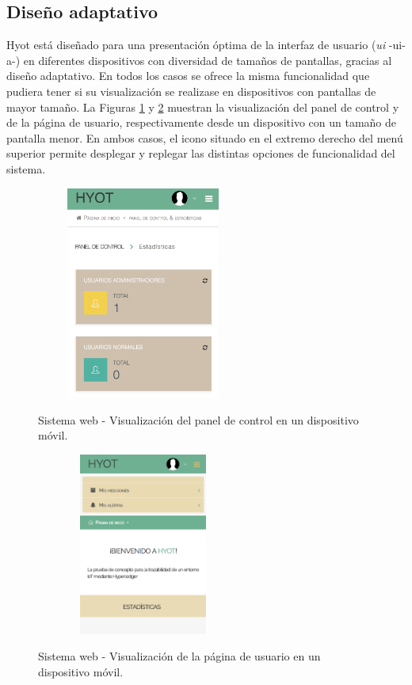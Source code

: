 \documentclass[12pt,a4paper, twoside]{report}
\begin{document}
	\subsection{Diseño adaptativo}
	
	Hyot está diseñado para una presentación óptima de la interfaz de usuario (\textit{\gls{ui}} -\gls{ui-a}-) en diferentes dispositivos con diversidad de tamaños de pantallas, gracias al diseño adaptativo. En todos los casos se ofrece la misma funcionalidad que pudiera tener si su visualización se realizase en dispositivos con pantallas de mayor tamaño. La Figuras \ref{fig:web_responsive1} y \ref{fig:web_responsive2} muestran la visualización del panel de control y de la página de usuario, respectivamente desde un dispositivo con un tamaño de pantalla menor. En ambos casos, el icono situado en el extremo derecho del menú superior permite desplegar y replegar las distintas opciones de funcionalidad del sistema.

		\begin{figure}[!ht]   
			\caption{Sistema web - Visualización del panel de control en un dispositivo móvil.} 
			\begin{center} 
	 			\includegraphics[width=7cm, height=7cm]{Images/userGuide/web/responsive1} \\
				\label{fig:web_responsive1} 
			\end{center}  	
		\end{figure}
	
		\begin{figure}[!ht]   
			\caption{Sistema web - Visualización de la página de usuario en un dispositivo móvil.} 
			\begin{center} 
	 			\includegraphics[width=7cm, height=6cm]{Images/userGuide/web/responsive2} \\
				\label{fig:web_responsive2} 
			\end{center}  	
		\end{figure}
	
\end{document}
